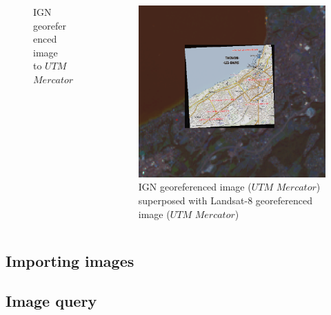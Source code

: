 \documentclass[c]{beamer}
\begin{document}
\begin{frame}
\begin{columns}
\begin{column}{2cm}
\begin{figure}
        \caption{IGN georeferenced image to $UTM$ $Mercator$}
    \end{figure}
  \end{column}
 \begin{column}{5cm}
    \begin{figure}
        \includegraphics[scale=0.09]{images/georeferencing/qgis-superposition0.png}
        \caption{IGN georeferenced image ($UTM$ $Mercator$) superposed with Landsat-8 georeferenced image ($UTM$ $Mercator$) }
    \end{figure}
 \end{column}
\end{columns}
\end{frame}

\subsection{Importing images}
\begin{frame}
 
\end{frame}

\subsection{Image query}
\begin{frame}
 
\end{frame}
\end{document}
